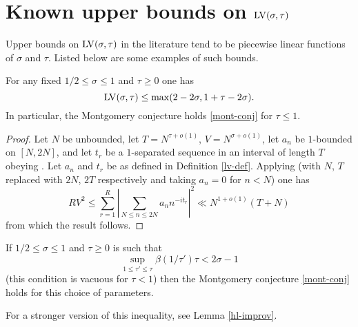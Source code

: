 \section{Known upper bounds on \texorpdfstring{$\mathrm{LV}(\sigma,\tau)$}{LV(sigma,tau)}}

Upper bounds on $\mathrm{LV}(\sigma,\tau)$ in the literature tend to be piecewise linear functions of $\sigma$ and $\tau$.  Listed below are some examples of such bounds.

\begin{theorem}\label{l2-mvt} For any fixed $1/2 \leq \sigma \leq 1$ and $\tau\geq 0$ one has
    $$ \mathrm{LV}(\sigma,\tau) \leq \max( 2-2\sigma, 1 + \tau - 2 \sigma).$$
In particular, the Montgomery conjecture holds \eqref{mont-conj} for $\tau \leq 1$.
\end{theorem}


\begin{proof}
Let $N$ be unbounded, let $T = N^{\tau + o(1)}$, $V = N^{\sigma + o(1)}$, let $a_n$ be $1$-bounded on $[N,2N]$, and let $t_r$ be a $1$-separated sequence in an interval of length $T$ obeying . Let $a_n$ and $t_r$ be as defined in Definition \ref{lv-def}. Applying \cite[Theorem~9.4]{ik} (with $N$, $T$ replaced with $2N$, $2T$ respectively and taking $a_n = 0$ for $n < N$) one has
\[
RV^2 \le \sum_{r = 1}^R\left|\sum_{N \le n \le 2N} a_n n^{-it_r}\right|^2 \ll N^{1 + o(1)}(T + N)
\]
from which the result follows.
\end{proof}

\begin{theorem}\label{montgomery-lv} If $1/2 \leq \sigma \leq 1$ and $\tau \geq 0$ is such that
\begin{equation}\label{tab}
\sup_{1 \leq \tau' \leq \tau} \beta(1/\tau') \tau < 2\sigma - 1
\end{equation}
(this condition is vacuous for $\tau < 1$) then the Montgomery conjecture \eqref{mont-conj} holds for this choice of parameters.
\end{theorem}

For a stronger version of this inequality, see Lemma \ref{hl-improv}.

